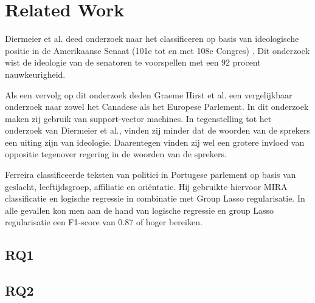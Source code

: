 \section{Related Work}
\label{sec:rel}

Diermeier et al. deed onderzoek naar het classificeren op basis van ideologische positie in de Amerikaanse Senaat (101e tot en met 108e Congres) \cite{diermeier_godbout_yu_kaufmann_2012}. Dit onderzoek wist de ideologie van de senatoren te voorspellen met een 92 procent nauwkeurigheid.\par
Als een vervolg op dit onderzoek deden Graeme Hirst et al. een vergelijkbaar onderzoek naar zowel het Canadese als het Europese Parlement\cite{Hirst_textto}. In dit onderzoek maken zij gebruik van support-vector machines. In tegenstelling tot het onderzoek van Diermeier et al., vinden zij minder dat de woorden van de sprekers een uiting zijn van ideologie. Daarentegen vinden zij wel een grotere invloed van oppositie tegenover regering in de woorden van de sprekers.\par
Ferreira classificeerde teksten van politici in Portugese parlement op basis van geslacht, leeftijdsgroep, affiliatie en oriëntatie\cite{Ferreira2016UsingTT}. Hij gebruikte hiervoor MIRA classificatie en logische regressie in combinatie met Group Lasso regularisatie. In alle gevallen kon men aan de hand van logische regressie en group Lasso regularisatie een F1-score van 0.87 of hoger bereiken.\par


\subsection{RQ1}

\subsection{RQ2}
